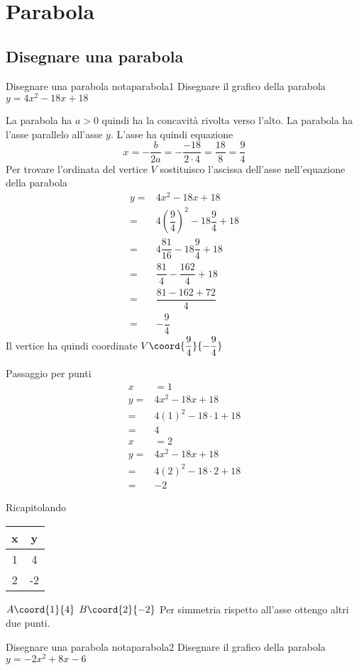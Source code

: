 \chapter{Parabola}
\label{cha:parabola}
\section{Disegnare una parabola}
\begin{esempiot}{Disegnare una parabola nota}{parabola1}
	Disegnare il grafico della parabola $y=4x^2-18x+18$
	\end{esempiot}
	La parabola ha $a>0$ quindi ha la concavità rivolta verso l'alto. La parabola ha l'asse parallelo all'asse $y$. L'asse ha quindi equazione\[x=-\dfrac{b}{2a}=-\dfrac{-18}{2\cdot 4}=\dfrac{18}{8}=\dfrac{9}{4}\]
	Per trovare l'ordinata del vertice $V$ sostituisco l'ascissa dell'asse nell'equazione della parabola
	\begin{align*}
y=&4x^2-18x+18\\
=&4\left( \dfrac{9}{4}\right)^2-18\dfrac{9}{4}+18\\
=&4\dfrac{81}{16}-18\dfrac{9}{4}+18\\
=&\dfrac{81}{4}-\dfrac{162}{4}+18\\
=&\dfrac{81-162+72}{4}\\
=&-\dfrac{9}{4}
	\end{align*}
	Il vertice ha quindi coordinate $V\coord{\dfrac{9}{4}}{-\dfrac{9}{4}}$
	
Passaggio per punti
\begin{align*}
x&=1\\
y=&4x^2-18x+18\\
=&4(1)^2-18\cdot1 +18\\
=&4
\end{align*}
\begin{align*}
x&=2\\
y=&4x^2-18x+18\\
=&4(2)^2-18\cdot2 +18\\
=&-2
\end{align*}

Ricapitolando
		\begin{tabular}{c|c}
			x & y\\
			\hline 
			1& 4 \\ 
			2&-2  \\ 
		\end{tabular}
			
$A\coord{1}{4}$ $B\coord{2}{-2}$ Per simmetria rispetto all'asse ottengo altri due punti.
\begin{center}
	
	\label{fig:disegnoparabola1}
\end{center}
\begin{esempiot}{Disegnare una parabola nota}{parabola2}
	Disegnare il grafico della parabola $y=-2x^2+8x-6$
\end{esempiot}

